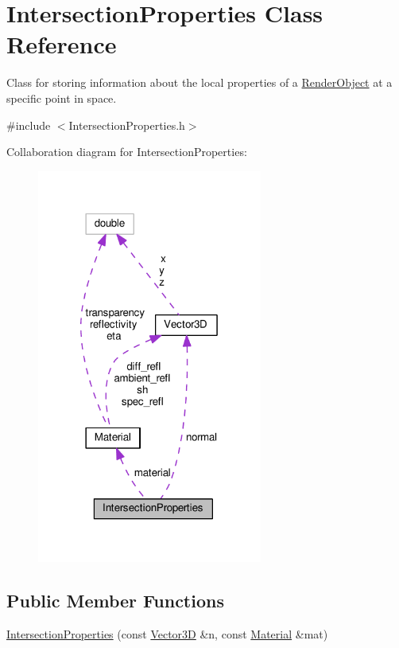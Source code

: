 \hypertarget{classIntersectionProperties}{}\section{Intersection\+Properties Class Reference}
\label{classIntersectionProperties}


Class for storing information about the local properties of a \hyperlink{classRenderObject}{Render\+Object} at a specific point in space.  




{\ttfamily \#include $<$Intersection\+Properties.\+h$>$}



Collaboration diagram for Intersection\+Properties\+:\nopagebreak
\begin{figure}[H]
\begin{center}
\leavevmode
\includegraphics[width=210pt]{classIntersectionProperties__coll__graph}
\end{center}
\end{figure}
\subsection*{Public Member Functions}
\begin{DoxyCompactItemize}
\item 
\hyperlink{classIntersectionProperties_a375cfefda4657bdc278504213347bde8}{Intersection\+Properties} (const \hyperlink{classVector3D}{Vector3D} \&n, const \hyperlink{classMaterial}{Material} \&mat)
\end{DoxyCompactItemize}
